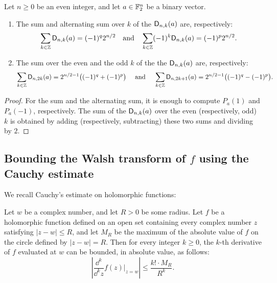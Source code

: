 \documentclass[11pt]{llncs}
\begin{document}
\begin{proposition}
    Let $n\geq 0$ be an even integer, and let $a\in\mathbb{F}_2^n$ be a binary vector.
    \begin{enumerate}
        \item The sum and alternating sum over $k$ of the $\mathsf{D}_{n,k}(a)$ are, respectively:
\[
 \sum_{k\in\mathbb{Z}}\mathsf{D}_{n,k}(a)=(-1)^{q}2^{n/2} \quad \text{and} \quad
 \sum_{k\in\mathbb{Z}}(-1)^k\mathsf{D}_{n,k}(a)=(-1)^{p}2^{n/2}.
\]
        \item The sum over the even and the odd $k$ of the the $\mathsf{D}_{n,k}(a)$ are, respectively:
\[
\sum_{k\in\mathbb{Z}}\mathsf{D}_{n,2k}(a)=2^{n/2-1}\big((-1)^{q}+(-1)^{p}\big) \quad \text{ and } \quad 
\sum_{k\in\mathbb{Z}}\mathsf{D}_{n,2k+1}(a)=2^{n/2-1}\big((-1)^{q}-(-1)^{p}\big).
\]
    
    \end{enumerate}

\end{proposition}

\begin{proof}
	For the sum and the alternating sum, it is enough to compute $P_a(1)$ and $P_a(-1)$, respectively. The sum of the $\mathsf{D}_{n,k}(a)$ over the even (respectively, odd) $k$ is obtained by adding (respectively, subtracting) these two sums and dividing by $2$.
\end{proof}

\subsection{Bounding the Walsh transform of $f$ using the Cauchy estimate}\label{sec:Cauchy}


We recall Cauchy's estimate on holomorphic functions:

\begin{Prop}\label{property:cauchy_estimate}
    Let $w$ be a complex number, and let $R>0$ be some radius. Let $f$ be a holomorphic function defined on an open set containing every complex number $z$ satisfying $|z-w|\leq R$, and let $M_R$ be the maximum of the absolute value of $f$ on the circle defined by $|z-w|=R$. Then for every integer $k\geq 0$, the $k$-th derivative of $f$ evaluated at $w$ can be bounded, in absolute value, as follows:
    \[
        \left|\frac{\dd^k}{\dd^k z}f(z)\vert_{z=w}\right|\leq\frac{k!\cdot M_R}{R^k}.
    \]
\end{Prop}
\end{document}
